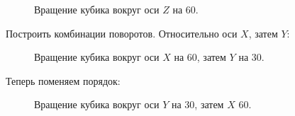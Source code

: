 \documentclass[a5paper, 10pt]{article}
\theoremstyle{definition}
\theoremstyle{plain}
\theoremstyle{remark}
\begin{document}
\begin{figure}[h!]
\caption{Вращение кубика вокруг оси $Z$ на 60\textdegree.}
\end{figure}

Построить комбинации поворотов. Относительно оси $X$, затем $Y$:
\begin{figure}[h!]
\caption{Вращение кубика вокруг оси $X$ на 60\textdegree, затем $Y$ на 30\textdegree .}
\end{figure}

\newpage
Теперь поменяем порядок:
\begin{figure}[h!]
\caption{Вращение кубика вокруг оси $Y$ на 30\textdegree, затем $X$ 60\textdegree.}
\end{figure}
\end{document}
